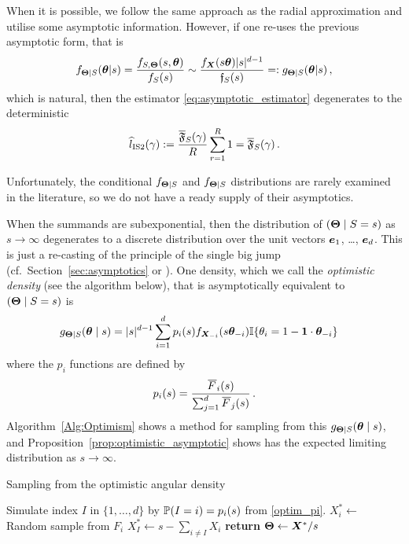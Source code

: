 When it is possible, we follow the same approach as the radial approximation and utilise some asymptotic information. However, if one re-uses the previous asymptotic form, that is
\[ f_{\bm{\Theta} \mid S}(\bm{\theta} | s) = \frac{f_{S,\bm{\Theta}}(s, \bm{\theta})}{f_S(s)} \sim \frac{f_{\bm{X}}(s \bm{\theta}) |s|^{d-1}}{\mathfrak{f}_S(s)} =: g_{\bm{\Theta} \mid S}(\bm{\theta} | s) \,, \]
which is natural, then the estimator \eqref{eq:asymptotic_estimator} degenerates to the deterministic
\begin{equation*} \label{eq:double_asymptotic_estimator}
\widehat{l}_{\mathrm{IS2}}(\gamma) := \frac{\overline{\mathfrak{F}}_S(\gamma)}{R} \sum_{r=1}^R 1 = \overline{\mathfrak{F}}_S(\gamma) \,.
\end{equation*}

Unfortunately, the conditional $f_{\bm{\Theta} \mid S}$ and $f_{\bm{\Theta} \mid S}$ distributions are rarely examined in the literature, so we do not have a ready supply of their asymptotics.

When the summands are subexponential, then the distribution of $(\bm{\Theta} \mid S = s)$ as $s\to\infty$ degenerates to a discrete distribution over the unit vectors $\bm{e}_1$, \dots, $\bm{e}_d$. This is just a re-casting of the principle of the single big jump (cf.\ Section~\ref{sec:asymptotics} or \cite{foss2011introduction}). One density, which we call the \emph{optimistic density} (see the algorithm below), that is asymptotically equivalent to $(\bm{\Theta} \mid S = s)$ is
\begin{align} \label{OptimisticPDF}
g_{\bm{\Theta} \mid S}(\bm{\theta} \mid s)
&= |s|^{d-1} \sum_{i=1}^d p_i(s) f_{\bm{X}_{-i}}(s \bm{\theta}_{-i}) \mathbb{I}\{  \theta_i = 1-\bm{1} \cdot \bm{\theta}_{-i}  \}
\end{align}
where the $p_i$ functions are defined by
\begin{equation} \label{optim_pi}
p_i(s) = \frac{\Ftail _i(s)}{\sum_{j=1}^d \Ftail _j(s)} \,.
\end{equation}
Algorithm~\ref{Alg:Optimism} shows a method for sampling from this $g_{\bm{\Theta} \mid S}(\bm{\theta} \mid s)$, and Proposition~\ref{prop:optimistic_asymptotic} shows has the expected limiting distribution as $s \to \infty$.

\begin{algorithm}[H]
\caption{Sampling from the optimistic angular density}\label{Alg:Optimism}
\begin{algorithmic}[1]
\State Simulate index $I$ in $\{1, \dots, d\}$ by $\operatorname{{\mathbb P}}(I=i) = p_i(s)$ from \eqref{optim_pi}.
\State $X_i^* \gets$ Random sample from $F_i$
\EndFor
\State $X_I^* \gets s - \sum_{i \not= I} X_i$ 
\State \textbf{return} $\bm{\Theta} \gets \bm{X}^* / s$
\EndProcedure
\end{algorithmic}
\end{algorithm}

